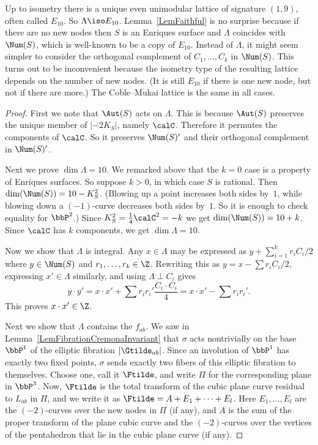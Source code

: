 \begin{rema}\label{rkMukaiLattice}
Up to isometry there is a unique even unimodular lattice of signature $(1,9)$, often called $E_{10}$. So $\Lambda\iso E_{10}$. Lemma~\ref{LemFaithful} is no surprise because if there are no new nodes then $S$ is an Enriques surface and $\Lambda$ coincides with $\Num(S)$, which is well-known to be a copy of $E_{10}$. Instead of $\Lambda$, it might seem simpler to consider the orthogonal complement of $C_1,\dots,C_k$ in $\Num(S)$. This turns out to be inconvenient because the isometry type of the resulting lattice depends on the number of new nodes. (It is still $E_{10}$ if there is one new node, but not if there are more.) The Coble--Mukai lattice is the same in all cases.
\end{rema}

\begin{proof}
First we note that $\Aut(S)$ acts on $\Lambda$. This is because $\Aut(S)$ preserves the unique member of $|-2K_S|$, namely $\calC$. Therefore it permutes the components of $\calC$. So it preserves $\Num(S)'$ and their orthogonal complement in $\Num(S)'$.

Next we prove $\dim\Lambda=10$. We remarked above that the $k=0$ case is a property of Enriques surfaces. So suppose $k>0$, in which case $S$ is rational. Then $\dim(\Num(S))=10-K_S^2$. (Blowing up a point increases both sides by~$1$, while blowing down a $(-1)$-curve decreases both sides by~$1$. So it is enough to check equality for $\bbP^2$.) Since $K_S^2=\frac14\calC^2=-k$ we get $\dim(\Num(S))=10+k$. Since $\calC$ has $k$ components, we get $\dim\Lambda=10$.

Now we show that $\Lambda$ is integral. Any $x\in\Lambda$ may be expressed as $y+\sum_{i=1}^k r_iC_i/2$ where $y\in\Num(S)$ and $r_1,\dots,r_k\in\Z$. Rewriting this as $y=x-\sum r_i C_i/2$, expressing $x'\in\Lambda$ similarly, and using $\Lambda\perp C_i$ gives
\begin{equation*}
y\cdot y' = x\cdot x' + \sum r_ir_i'\frac{C_i\cdot C_i}{4} = x\cdot x'-\sum r_i r_i'.
\end{equation*}
This proves $x\cdot x'\in\Z$.


Next we show that $\Lambda$ contains the $f_{ab}$. We saw in Lemma~\ref{LemFibrationCremonaInvariant} that $\sigma$ acts nontrivially on the base $\bbP^1$ of the elliptic fibration $|\Gtilde_{ab}|$. Since an involution of $\bbP^1$ has exactly two fixed points, $\sigma$ sends exactly two fibers of this elliptic fibration to themselves. Choose one, call it $\Ftilde$, and write $\Pi$ for the corresponding plane in $\bbP^3$. Now, $\Ftilde$ is the total transform of the cubic plane curve residual to $L_{ab}$ in $\Pi$, and we write it as $\Ftilde=A+E_1+\cdots+E_l$. Here $E_1,\dots,E_l$ are the $(-2)$-curves over the new nodes in $\Pi$ (if any), and $A$ is the sum of the proper transform of the plane cubic curve and the $(-2)$-curves over the vertices of the pentahedron that lie in the cubic plane curve (if any).


\end{proof}
